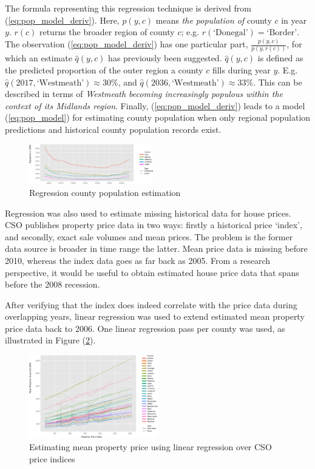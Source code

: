 \documentclass[twocolumn]{article}
\begin{document}
The formula representing this regression technique is derived from
(\ref{eq:pop_model_deriv}).  Here, $p(y, c)$ means {\it the population of}
county $c$ in year $y$.  $r(c)$ returns the broader region of county $c$;
e.g. $r(\text{`Donegal'}) = \text{`Border'}$.  The observation (\ref{eq:pop_model_deriv}) has one particular part, $\frac{p(y, c)}{p(y, r(c))}$, for which
an estimate $\hat{q}(y, c)$ has previously been suggested.  $\hat{q}(y, c)$ is defined as the
predicted proportion of the outer region a county $c$ fills during year $y$.
E.g. 
$\hat{q}(2017, \text{`Westmeath'}) \approx 30\%$, and 
$\hat{q}(2036, \text{`Westmeath'}) \approx 33\%$.  This can be described
in terms of {\it Westmeath becoming increasingly populous within the context
of its Midlands region}.
Finally, (\ref{eq:pop_model_deriv}) leads to a model (\ref{eq:pop_model})
for estimating county population when only regional population predictions
and historical county population records exist.

\begin{figure}
    \centering
    \includegraphics[width=0.48\textwidth]{media/pdf/population_by_county_linear_regression.svg.pdf}
    \caption{Regression county population estimation\label{regression1}}
\end{figure}

Regression was also used to estimate missing
historical data for house prices.  CSO publishes property price data in two
ways: firstly a historical price `index', and secondly, exact sale volumes and
mean prices.  The problem is the former data source is broader in time range
the latter.  Mean price data is missing before 2010, whereas the index data
goes as far back as 2005.  From a research perspective, it would be useful to
obtain estimated house price data that spans before the 2008 recession.

After verifying that the index does indeed correlate with the
price data during overlapping years, linear regression was used to extend
estimated mean property price data back to 2006.  One linear regression pass
per county was used, as illustrated in Figure (\ref{per_county}).

\begin{figure}
    \centering
    \includegraphics[width=0.50\textwidth]{media/pdf/property_price_linear_regression.svg.pdf}
    \caption{Estimating mean property price using linear regression over CSO price indices\label{per_county}}
\end{figure}
\end{document}
